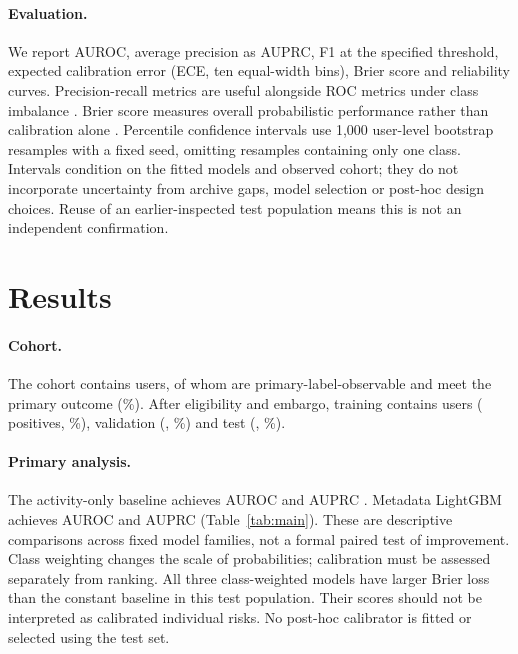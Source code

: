 \documentclass[10pt,twocolumn]{article}
\begin{document}
\paragraph{Evaluation.} We report AUROC, average precision as AUPRC, F1 at the specified threshold, expected calibration error (ECE, ten equal-width bins), Brier score and reliability curves. Precision-recall metrics are useful alongside ROC metrics under class imbalance \cite{saito2015}. Brier score measures overall probabilistic performance rather than calibration alone \cite{sklearncalibration}. Percentile confidence intervals use 1,000 user-level bootstrap resamples with a fixed seed, omitting resamples containing only one class. Intervals condition on the fitted models and observed cohort; they do not incorporate uncertainty from archive gaps, model selection or post-hoc design choices. Reuse of an earlier-inspected test population means this is not an independent confirmation.

\section{Results}
\paragraph{Cohort.} The cohort contains \NCohort{} users, of whom \NEligA{} are primary-label-observable and \NDeepA{} meet the primary outcome (\PctDeepA\%). After eligibility and embargo, training contains \NTrain{} users (\PosTrain{} positives, \RateTrain\%), validation \NVal{} (\PosVal{}, \RateVal\%) and test \NTest{} (\PosTest{}, \RateTest\%).

\begin{table}[t]\centering\small

\caption{Primary-label class balance and UTC entry-date ranges after embargo.}\label{tab:balance}
\end{table}

\begin{table}[t]\centering\small\setlength{\tabcolsep}{5pt}

\caption{Corrected metadata-only Task A results. Brackets give conditional 95\% bootstrap intervals. ECE and Brier score are better when lower. The constant baseline retains training-prevalence probabilities and uses a fixed majority decision.}\label{tab:main}
\end{table}

\paragraph{Primary analysis.} The activity-only baseline achieves AUROC \AurocAct{} and AUPRC \AuprcAct{}. Metadata LightGBM achieves AUROC \AurocLgbm{} and AUPRC \AuprcLgbm{} (Table~\ref{tab:main}). These are descriptive comparisons across fixed model families, not a formal paired test of improvement. Class weighting changes the scale of probabilities; calibration must be assessed separately from ranking. All three class-weighted models have larger Brier loss than the constant baseline in this test population. Their scores should not be interpreted as calibrated individual risks. No post-hoc calibrator is fitted or selected using the test set.
\end{document}
